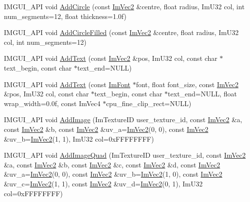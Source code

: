 \begin{DoxyCompactItemize}
I\+M\+G\+U\+I\+\_\+\+A\+PI void \hyperlink{struct_im_draw_list_a26c34a87eca6aefa02ca4e4951dcd170}{Add\+Circle} (const \hyperlink{struct_im_vec2}{Im\+Vec2} \&centre, float radius, Im\+U32 col, int num\+\_\+segments=12, float thickness=1.\+0f)
\item 
I\+M\+G\+U\+I\+\_\+\+A\+PI void \hyperlink{struct_im_draw_list_a293e87d22e17587e3994cf6deb20be45}{Add\+Circle\+Filled} (const \hyperlink{struct_im_vec2}{Im\+Vec2} \&centre, float radius, Im\+U32 col, int num\+\_\+segments=12)
\item 
I\+M\+G\+U\+I\+\_\+\+A\+PI void \hyperlink{struct_im_draw_list_ac5221bd86b3429f6d5b6e6ffe454942d}{Add\+Text} (const \hyperlink{struct_im_vec2}{Im\+Vec2} \&pos, Im\+U32 col, const char $\ast$text\+\_\+begin, const char $\ast$text\+\_\+end=N\+U\+LL)
\item 
I\+M\+G\+U\+I\+\_\+\+A\+PI void \hyperlink{struct_im_draw_list_a0a226cbe9bb1480428e145d8535cda26}{Add\+Text} (const \hyperlink{struct_im_font}{Im\+Font} $\ast$font, float font\+\_\+size, const \hyperlink{struct_im_vec2}{Im\+Vec2} \&pos, Im\+U32 col, const char $\ast$text\+\_\+begin, const char $\ast$text\+\_\+end=N\+U\+LL, float wrap\+\_\+width=0.\+0f, const Im\+Vec4 $\ast$cpu\+\_\+fine\+\_\+clip\+\_\+rect=\+N\+U\+L\+L)
\item 
I\+M\+G\+U\+I\+\_\+\+A\+PI void \hyperlink{struct_im_draw_list_ac37cd998bf5f40705c7445004a029b66}{Add\+Image} (Im\+Texture\+ID user\+\_\+texture\+\_\+id, const \hyperlink{struct_im_vec2}{Im\+Vec2} \&a, const \hyperlink{struct_im_vec2}{Im\+Vec2} \&b, const \hyperlink{struct_im_vec2}{Im\+Vec2} \&uv\+\_\+a=\hyperlink{struct_im_vec2}{Im\+Vec2}(0, 0), const \hyperlink{struct_im_vec2}{Im\+Vec2} \&uv\+\_\+b=\hyperlink{struct_im_vec2}{Im\+Vec2}(1, 1), Im\+U32 col=0x\+F\+F\+F\+F\+F\+F\+F\+F)
\item 
I\+M\+G\+U\+I\+\_\+\+A\+PI void \hyperlink{struct_im_draw_list_a1cc1f8d4d1812c65c7887b8d5aef31fe}{Add\+Image\+Quad} (Im\+Texture\+ID user\+\_\+texture\+\_\+id, const \hyperlink{struct_im_vec2}{Im\+Vec2} \&a, const \hyperlink{struct_im_vec2}{Im\+Vec2} \&b, const \hyperlink{struct_im_vec2}{Im\+Vec2} \&c, const \hyperlink{struct_im_vec2}{Im\+Vec2} \&d, const \hyperlink{struct_im_vec2}{Im\+Vec2} \&uv\+\_\+a=\hyperlink{struct_im_vec2}{Im\+Vec2}(0, 0), const \hyperlink{struct_im_vec2}{Im\+Vec2} \&uv\+\_\+b=\hyperlink{struct_im_vec2}{Im\+Vec2}(1, 0), const \hyperlink{struct_im_vec2}{Im\+Vec2} \&uv\+\_\+c=\hyperlink{struct_im_vec2}{Im\+Vec2}(1, 1), const \hyperlink{struct_im_vec2}{Im\+Vec2} \&uv\+\_\+d=\hyperlink{struct_im_vec2}{Im\+Vec2}(0, 1), Im\+U32 col=0x\+F\+F\+F\+F\+F\+F\+F\+F)

\end{DoxyCompactItemize}
